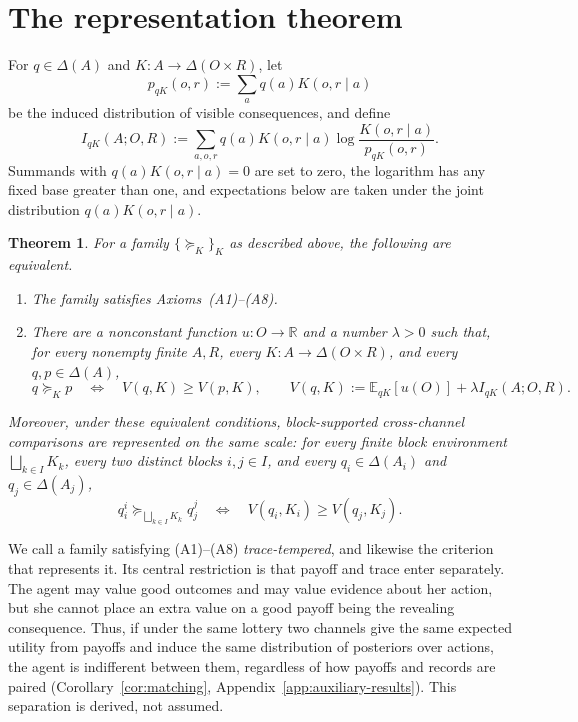 \documentclass[11pt,a4paper]{article}
\newtheorem{theorem}{Theorem}
\theoremstyle{definition}
\newcommand{\D}{\Delta}
\newcommand{\E}{\mathbb E}
\newcommand{\I}{I}
\newcommand{\1}{\mathbf 1}
\begin{document}
\section{The representation theorem}\label{sec:theorem}

For $q\in\D(A)$ and $K:A\to\D(O\times R)$, let
\[
 p_{qK}(o,r):=\sum_a q(a)K(o,r\mid a)
\]
be the induced distribution of visible consequences, and define
\begin{equation}
 \I_{qK}(A;O,R)
 :=\sum_{a,o,r}q(a)K(o,r\mid a)
 \log\frac{K(o,r\mid a)}{p_{qK}(o,r)}.
 \label{eq:mi}
\end{equation}
Summands with $q(a)K(o,r\mid a)=0$ are set to zero, the logarithm has any fixed base greater than one, and expectations below are
taken under the joint distribution $q(a)K(o,r\mid a)$.

\begin{theorem}\label{thm:main}
For a family $\{\succeq_K\}_K$ as described above, the following are equivalent.
\begin{enumerate}[label=\textup{(\roman*)},leftmargin=*]
\item The family satisfies Axioms~\textup{(A1)--(A8)}.
\item There are a nonconstant function $u:O\to\mathbb R$ and a number $\lambda>0$ such that, for every nonempty
finite $A,R$, every $K:A\to\D(O\times R)$, and every $q,p\in\D(A)$,
\begin{equation}
 q\succeq_Kp
 \quad\Longleftrightarrow\quad
 V(q,K)\ge V(p,K),
 \qquad
 V(q,K):=\E_{qK}[u(O)]+\lambda\I_{qK}(A;O,R).
 \label{eq:representation}
\end{equation}
\end{enumerate}
Moreover, under these equivalent conditions, block-supported cross-channel comparisons are represented on the same
scale: for every finite block environment $\bigsqcup_{k\in I}K_k$, every two distinct blocks $i,j\in I$, and every
$q_i\in\D(A_i)$ and $q_j\in\D(A_j)$,
\[
 q_i^i\succeq_{\bigsqcup_{k\in I}K_k}q_j^j
 \quad\Longleftrightarrow\quad
 V(q_i,K_i)\ge V(q_j,K_j).
\]
\end{theorem}

We call a family satisfying \textup{(A1)--(A8)} \emph{trace-tempered}, and likewise the criterion that
represents it.  Its central restriction is that payoff and trace enter separately.  The agent may value good
outcomes and may value evidence about her action, but she cannot place an extra value on a good payoff being the
revealing consequence.  Thus, if under the same lottery two channels give the same expected utility from payoffs
and induce the same distribution of posteriors over actions, the agent is indifferent between them, regardless of
how payoffs and records are paired (Corollary~\ref{cor:matching}, Appendix~\ref{app:auxiliary-results}).  This
separation is derived, not assumed.
\end{document}
